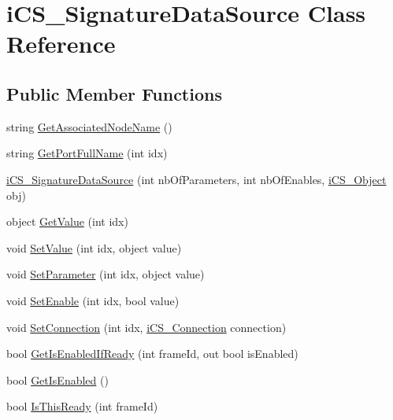 \hypertarget{classi_c_s___signature_data_source}{\section{i\+C\+S\+\_\+\+Signature\+Data\+Source Class Reference}
\label{classi_c_s___signature_data_source}
}
\subsection*{Public Member Functions}
\begin{DoxyCompactItemize}
\item 
string \hyperlink{classi_c_s___signature_data_source_a0b41c9d21d6cf17d3f0ebbe02629e5c7}{Get\+Associated\+Node\+Name} ()
\item 
string \hyperlink{classi_c_s___signature_data_source_a317321b6b88af83758a1f91b1a03b14a}{Get\+Port\+Full\+Name} (int idx)
\item 
\hyperlink{classi_c_s___signature_data_source_a95f9b26d4366c51b76f1db8473c22cd1}{i\+C\+S\+\_\+\+Signature\+Data\+Source} (int nb\+Of\+Parameters, int nb\+Of\+Enables, \hyperlink{classi_c_s___object}{i\+C\+S\+\_\+\+Object} obj)
\item 
object \hyperlink{classi_c_s___signature_data_source_aa4388683bd3beed2eb733cfa5871c2a2}{Get\+Value} (int idx)
\item 
void \hyperlink{classi_c_s___signature_data_source_a4c2ac1a8093c40484f97ca73be063858}{Set\+Value} (int idx, object value)
\item 
void \hyperlink{classi_c_s___signature_data_source_a291ede6b0087458cb58efd81817e7dcf}{Set\+Parameter} (int idx, object value)
\item 
void \hyperlink{classi_c_s___signature_data_source_a79ff1e76216563a6678d272505c56309}{Set\+Enable} (int idx, bool value)
\item 
void \hyperlink{classi_c_s___signature_data_source_a68151b8d5ba25af12a4287a643946c48}{Set\+Connection} (int idx, \hyperlink{classi_c_s___connection}{i\+C\+S\+\_\+\+Connection} connection)
\item 
bool \hyperlink{classi_c_s___signature_data_source_a605a096c63b91649d743fc291eb0b774}{Get\+Is\+Enabled\+If\+Ready} (int frame\+Id, out bool is\+Enabled)
\item 
bool \hyperlink{classi_c_s___signature_data_source_ac5d3a3ff18fcd56adf7c4dc592b9f939}{Get\+Is\+Enabled} ()
\item 
bool \hyperlink{classi_c_s___signature_data_source_a98fe89b05950850770cbd1eba515760c}{Is\+This\+Ready} (int frame\+Id)

\end{DoxyCompactItemize}
